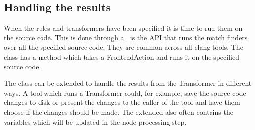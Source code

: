 \subsection{Handling the results} \label{subsec:080dev:HandlingToolResults}

When the rules and transformers have been specified it is time to run them on the source code. This is done through a .  is the API that runs the match finders over all the specified source code. They are common across all clang tools. The  class has a  method which takes a FrontendAction and runs it on the specified source code. 

The  class can be extended to handle the results from the Transformer in different ways. A tool which runs a Transformer could, for example, save the source code changes to disk or present the changes to the caller of the tool and have them choose if the changes should be made. The extended  also often contains the variables which will be updated in the node processing step.